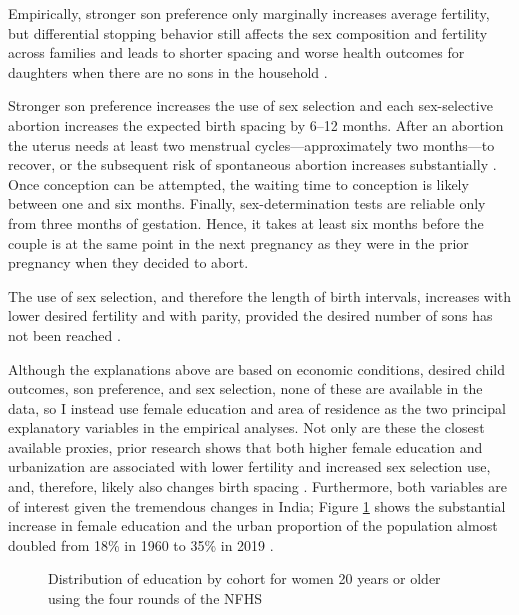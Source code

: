 Empirically, stronger son preference only marginally increases average fertility, but
differential stopping behavior still affects the sex composition and fertility across 
families and leads to shorter spacing and worse health outcomes for daughters  
when there are no sons in the household
\citep{repetto72,clark00,Whitworth2002,Basu2010,Jayachandran2011,Barcellos2014}.
 
Stronger son preference increases the use of sex selection and each sex-selective
abortion increases the expected birth spacing by 6--12 months.
After an abortion the uterus needs at least two menstrual cycles---approximately 
two months---to recover, or the subsequent risk of spontaneous abortion increases 
substantially \citep{zhou00b}.
Once conception can be attempted, the waiting time to conception is likely between
one and six months. 
Finally, sex-determination tests are reliable only from three months of gestation. 
Hence, it takes at least six months before the couple is at the same point in the next 
pregnancy as they were in the prior pregnancy when they decided to abort.

The use of sex selection, and therefore the length of birth intervals, increases with
lower desired fertility and with parity, provided the desired number of sons has 
not been reached \citep{Portner2015b,Jayachandran2017}.  

Although the explanations above are based on economic conditions, desired child outcomes,
son preference, and sex selection, none of these are available in the data, so I instead 
use female education and area of residence as the two principal explanatory variables in 
the empirical analyses.
Not only are these the closest available proxies, prior research shows that both higher 
female education and urbanization are associated with lower fertility and increased 
sex selection use, and, therefore, likely also changes birth spacing
\citep{das_gupta97,dreze01,bhat03,retherford03b,Guilmoto2009a,Portner2015b,Jayachandran2017}.
Furthermore, both variables are of interest given the tremendous changes in India; 
Figure \ref{fig:education_over_time} shows the substantial increase in female education
and the urban proportion of the population almost doubled from 18\% in 1960 to 35\% in 
2019 \citep{United-Nations2019}.

\begin{figure}[htpb]
\centering
{} 
\caption{Distribution of education by cohort for women 20 years or older
using the four rounds of the NFHS}
\label{fig:education_over_time}
\end{figure}


